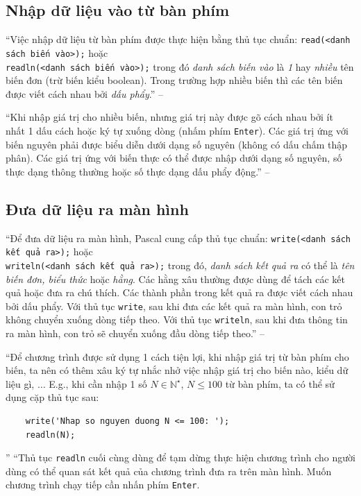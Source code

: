 \documentclass[oneside]{book}
\numberwithin{equation}{section}
\begin{document}
\subsection{Nhập dữ liệu vào từ bàn phím}
``Việc nhập dữ liệu từ bàn phím được thực hiện bằng thủ tục chuẩn: \verb|read(<danh sách biến vào>);| hoặc\\\verb|readln(<danh sách biến vào>);| trong đó \textit{danh sách biến vào} là \textit{1} hay \textit{nhiều} tên biến đơn (trừ biến kiểu boolean). Trong trường hợp nhiều biến thì các tên biến được viết cách nhau bởi \textit{dấu phẩy}.'' -- \cite[p. 29]{SGK_Tin_Hoc_11}

``Khi nhập giá trị cho nhiều biến, nhưng giá trị này được gõ cách nhau bởi ít nhất 1 dấu cách hoặc ký tự xuống dòng (nhấm phím \texttt{Enter}). Các giá trị ứng với biến nguyên phải được biểu diễn dưới dạng số nguyên (không có dấu chấm thập phân). Các giá trị ứng với biến thực có thể được nhập dưới dạng số nguyên, số thực dạng thông thường hoặc số thực dạng dấu phẩy động.'' -- \cite[p. 30]{SGK_Tin_Hoc_11}

\subsection{Đưa dữ liệu ra màn hình}
``Để đưa dữ liệu ra màn hình, Pascal cung cấp thủ tục chuẩn: \verb|write(<danh sách kết quả ra>);| hoặc\\\verb|writeln(<danh sách kết quả ra>);| trong đó, \textit{danh sách kết quả ra} có thể là \textit{tên biến đơn, biểu thức} hoặc \textit{hằng}. Các hằng xâu thường được dùng để tách các kết quả hoặc đưa ra chú thích. Các thành phần trong kết quả ra được viết cách nhau bởi dấu phẩy. Với thủ tục \texttt{write}, sau khi đưa các kết quả ra màn hình, con trỏ không chuyển xuống dòng tiếp theo. Với thủ tục \texttt{writeln}, sau khi đưa thông tin ra màn hình, con trỏ sẽ chuyển xuống đầu dòng tiếp theo.'' -- \cite[p. 30]{SGK_Tin_Hoc_11}

``Để chương trình được sử dụng 1 cách tiện lợi, khi nhập giá trị từ bàn phím cho biến, ta nên có thêm xâu ký tự nhắc nhở việc nhập giá trị cho biến nào, kiểu dữ liệu gì, $\ldots$ E.g., khi cần nhập 1 số $N\in\mathbb{N}^\star$, $N\le 100$ từ bàn phím, ta có thể sử dụng cặp thủ tục sau:
\begin{verbatim}
	write('Nhap so nguyen duong N <= 100: ');
	readln(N);
\end{verbatim}
'' ``Thủ tục \texttt{readln} cuối cùng dùng để tạm dừng thực hiện chương trình cho người dùng có thể quan sát kết quả của chương trình đưa ra trên màn hình. Muốn chương trình chạy tiếp cần nhấn phím \texttt{Enter}.
\end{document}
